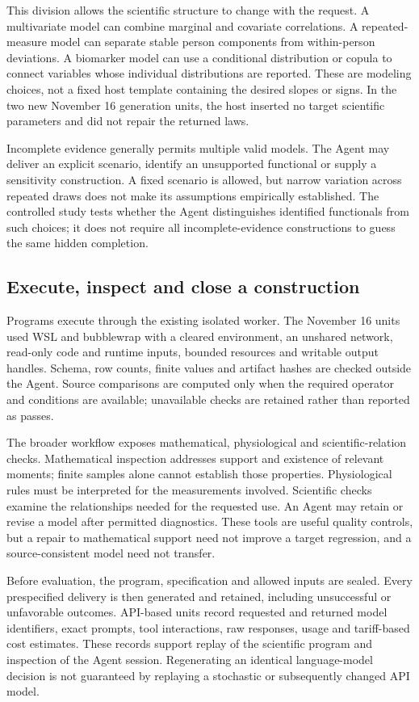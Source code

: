 \documentclass[11pt,letterpaper]{article}
\begin{document}
This division allows the scientific structure to change with the request. A multivariate model can combine marginal and covariate correlations. A repeated-measure model can separate stable person components from within-person deviations. A biomarker model can use a conditional distribution or copula to connect variables whose individual distributions are reported. These are modeling choices, not a fixed host template containing the desired slopes or signs. In the two new November 16 generation units, the host inserted no target scientific parameters and did not repair the returned laws.


Incomplete evidence generally permits multiple valid models. The Agent may deliver an explicit scenario, identify an unsupported functional or supply a sensitivity construction. A fixed scenario is allowed, but narrow variation across repeated draws does not make its assumptions empirically established. The controlled study tests whether the Agent distinguishes identified functionals from such choices; it does not require all incomplete-evidence constructions to guess the same hidden completion.


\subsection{Execute, inspect and close a construction}

Programs execute through the existing isolated worker. The November 16 units used WSL and bubblewrap with a cleared environment, an unshared network, read-only code and runtime inputs, bounded resources and writable output handles. Schema, row counts, finite values and artifact hashes are checked outside the Agent. Source comparisons are computed only when the required operator and conditions are available; unavailable checks are retained rather than reported as passes.


The broader workflow exposes mathematical, physiological and scientific-relation checks. Mathematical inspection addresses support and existence of relevant moments; finite samples alone cannot establish those properties. Physiological rules must be interpreted for the measurements involved. Scientific checks examine the relationships needed for the requested use. An Agent may retain or revise a model after permitted diagnostics. These tools are useful quality controls, but a repair to mathematical support need not improve a target regression, and a source-consistent model need not transfer.


Before evaluation, the program, specification and allowed inputs are sealed. Every prespecified delivery is then generated and retained, including unsuccessful or unfavorable outcomes. API-based units record requested and returned model identifiers, exact prompts, tool interactions, raw responses, usage and tariff-based cost estimates. These records support replay of the scientific program and inspection of the Agent session. Regenerating an identical language-model decision is not guaranteed by replaying a stochastic or subsequently changed API model.
\end{document}
